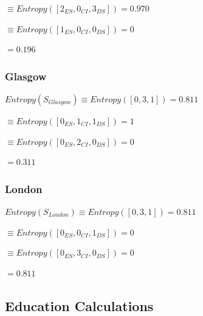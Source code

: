 \documentclass[8pt]{article}
\begin{document}
        \begin{description}
          \setlength{\itemsep}{1pt}
          \setlength{\parskip}{0pt}
          \setlength{\parsep}{0pt}
          \item[$Entropy(S_{Edinburgh/Single})$] $\equiv Entropy([2_{ES},0_{CI},3_{DS}]) = 0.970$
          \item[$Entropy(S_{Edinburgh/Relationship})$] $\equiv Entropy([1_{ES},0_{CI},0_{DS}]) = 0$
          \item[$Gain(S_{Edinburgh},RS)$] $= 0.196$
        \end{description}

      \subsubsection{Glasgow}
        $Entropy(S_{Glasgow}) \equiv Entropy([0,3,1])=0.811$ 

        \begin{description}
          \setlength{\itemsep}{1pt}
          \setlength{\parskip}{0pt}
          \setlength{\parsep}{0pt}
          \item[$Entropy(S_{Glasgow/Single})$] $\equiv Entropy([0_{ES},1_{CI},1_{DS}]) = 1$
          \item[$Entropy(S_{Glasgow/Relationship})$] $\equiv Entropy([0_{ES},2_{CI},0_{DS}]) = 0$
          \item[$Gain(S_{Glasgow},RS)$] $= 0.311$
        \end{description}


      \subsubsection{London}
         $Entropy(S_{London}) \equiv Entropy([0,3,1])=0.811$

        \begin{description}
          \setlength{\itemsep}{1pt}
          \setlength{\parskip}{0pt}
          \setlength{\parsep}{0pt}
          \item[$Entropy(S_{London/Single})$] $\equiv Entropy([0_{ES},0_{CI},1_{DS}]) = 0$
          \item[$Entropy(S_{London/Relationship})$] $\equiv Entropy([0_{ES},3_{CI},0_{DS}]) = 0$
          \item[$Gain(S_{London},RS)$] $= 0.811$
        \end{description} 


    \subsection{Education Calculations}
\end{document}
